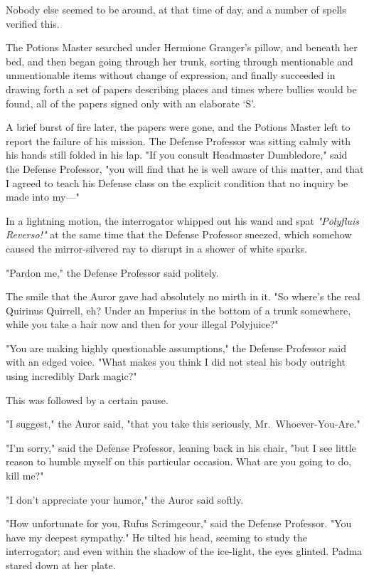 Nobody else seemed to be around, at that time of day, and a number of spells
verified this.

The Potions Master searched under Hermione Granger's pillow, and beneath her
bed, and then began going through her trunk, sorting through mentionable and
unmentionable items without change of expression, and finally succeeded in
drawing forth a set of papers describing places and times where bullies would
be found, all of the papers signed only with an elaborate `S'.

A brief burst of fire later, the papers were gone, and the Potions Master left
to report the failure of his mission.
\sbreak
The Defense Professor was sitting calmly with his hands still folded in his
lap. "If you consult Headmaster Dumbledore," said the Defense Professor, "you
will find that he is well aware of this matter, and that I agreed to teach his
Defense class on the explicit condition that no inquiry be made into my\mbox{---}"

In a lightning motion, the interrogator whipped out his wand and spat
\emph{"Polyfluis Reverso!"} at the same time that the Defense Professor
sneezed, which somehow caused the mirror-silvered ray to disrupt in a shower of
white sparks.

"Pardon me," the Defense Professor said politely.

The smile that the Auror gave had absolutely no mirth in it. "So where's the
real Quirinus Quirrell, eh? Under an Imperius in the bottom of a trunk
somewhere, while you take a hair now and then for your illegal Polyjuice?"

"You are making highly questionable assumptions," the Defense Professor said
with an edged voice. "What makes you think I did not steal his body outright
using incredibly Dark magic?"

This was followed by a certain pause.

"I suggest," the Auror said, "that you take this seriously,
Mr.~Whoever-You-Are."

"I'm sorry," said the Defense Professor, leaning back in his chair, "but I see
little reason to humble myself on this particular occasion. What are you going
to do, kill me?"

"I don't appreciate your humor," the Auror said softly.

"How unfortunate for you, Rufus Scrimgeour," said the Defense Professor. "You
have my deepest sympathy." He tilted his head, seeming to study the
interrogator; and even within the shadow of the ice-light, the eyes glinted.
\sbreak
Padma stared down at her plate.

